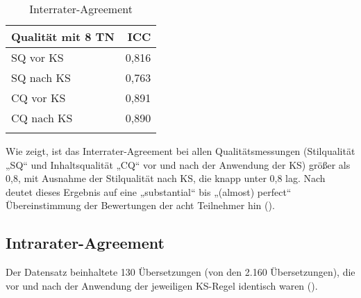 \begin{table}
\begin{tabularx}{.4\textwidth}{lr}
\lsptoprule
\textbf{Qualität mit 8 TN} & \textbf{ICC}\\
\midrule
SQ vor KS & 0,816\\
SQ nach KS & 0,763\\
CQ vor KS & 0,891\\
CQ nach KS & 0,890\\
\lspbottomrule
\end{tabularx}
\caption{\label{tab:05:12} Interrater-Agreement}
\end{table}

Wie  zeigt, ist das Interrater-Agreement bei allen Qualitätsmessungen (Stilqualität „SQ“ und Inhaltsqualität „CQ“ vor und nach der Anwendung der KS) größer als 0,8, mit Ausnahme der Stilqualität nach KS, die knapp unter 0,8 lag. Nach \citet{LandisKoch1977} deutet dieses Ergebnis auf eine „substantial“ bis „(almost) perfect“ Übereinstimmung der Bewertungen der acht Teilnehmer hin ().

\subsection{Intrarater-Agreement}
\label{sec:5.1.3}
Der Datensatz beinhaltete 130 Übersetzungen (von den 2.160 Übersetzungen), die vor und nach der Anwendung der jeweiligen KS-Regel identisch waren ().

